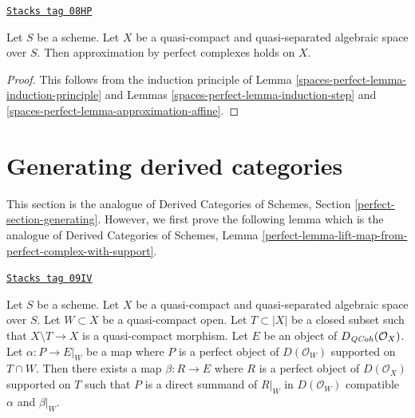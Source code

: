 \begin{theorem}[Approximation]
\label{spaces-perfect-theorem-approximation}
\href{https://stacks.math.columbia.edu/tag/08HP}{\texttt{Stacks tag 08HP}}

Let $S$ be a scheme.
Let $X$ be a quasi-compact and quasi-separated algebraic space over $S$.
Then approximation by perfect complexes holds on $X$.
\end{theorem}

\begin{proof}
This follows from the induction principle of
Lemma \ref{spaces-perfect-lemma-induction-principle}
and Lemmas \ref{spaces-perfect-lemma-induction-step} and \ref{spaces-perfect-lemma-approximation-affine}.
\end{proof}

\section{Generating derived categories}
\label{spaces-perfect-section-generating}
This section is the analogue of
Derived Categories of Schemes, Section \ref{perfect-section-generating}.
However, we first prove the following lemma which is the
analogue of Derived Categories of Schemes, Lemma
\ref{perfect-lemma-lift-map-from-perfect-complex-with-support}.

\begin{lemma}
\label{spaces-perfect-lemma-lift-map-from-perfect-complex-with-support}
\href{https://stacks.math.columbia.edu/tag/09IV}{\texttt{Stacks tag 09IV}}

Let $S$ be a scheme. Let $X$ be a quasi-compact and quasi-separated
algebraic space over $S$. Let $W \subset X$ be a quasi-compact open.
Let $T \subset |X|$ be a closed subset such that
$X \setminus T \to X$ is a quasi-compact morphism.
Let $E$ be an object of $D_{\mathit{QCoh}}(\mathcal{O}_X)$.
Let $\alpha : P \to E|_W$ be a map where $P$ is a perfect object of
$D(\mathcal{O}_W)$ supported on $T \cap W$. Then there exists a map
$\beta : R \to E$ where $R$ is a perfect object of $D(\mathcal{O}_X)$
supported on $T$ such that $P$ is a direct summand of $R|_W$ in
$D(\mathcal{O}_W)$ compatible $\alpha$ and $\beta|_W$.
\end{lemma}

